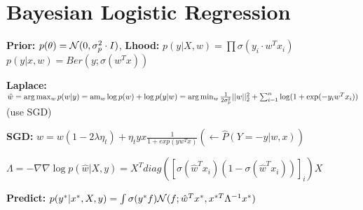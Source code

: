 \section{Bayesian Logistic Regression}
\textbf{Prior:} $p(\theta) = \mathcal{N}(0, \sigma_p^2 \cdot I)$, \textbf{Lhood:} $p(y|X,w) = \prod \sigma(y_i \cdot w^T x_i)$\\
$p(y|x,w) = Ber(y; \sigma(w^T x))$\\
\begin{comment}
	When the argument is positive, then the sigmoid function is evaluating to something bigger than 0.5, if it is negative, it is evaluating to something lower.\\
	Only if the signs of the label and the prediction match the evaluation is positive.\\
\end{comment}

\textbf{Laplace:} $\hat{w} = \arg\max_w p(w | y) 
= \text{am}_w \log p(w) + \log p(y|w)\\
= \arg\min_w \frac{1}{2 \sigma_p^2} ||w||^2_2 + \sum_{i=1}^n \log(1 + \exp(-y_i w^T x_i))$ (use SGD)\\
\begin{comment}
	\textbf{Logistic Regression:} Seeking the mode is giving us the loss of the standart logistic Regression.
	Use log and remove constants to get the Logistic Loss.\\
\end{comment}

\textbf{SGD:} $w = w(1-2\lambda \eta_t)+\eta_t y x \frac{1}{1+exp(yw^Tx)} (\leftarrow \hat{P}(Y = -y | w,x))$

$\Lambda = -\nabla\nabla \log p(\hat{w}| X,y)
= X^T diag([\sigma(\hat{w}^T x_i)(1 - \sigma(\hat{w}^T x_i))]_i) X$

\textbf{Predict:} $p(y^*|x^*,X,y) = \int \sigma(y^*f) \mathcal{N}(f; \hat{w}^Tx^*, x^{*T}\Lambda^{-1} x^*)$\\
\begin{comment}
	This integral still has no closed form, but can be efficiently approximated with Gaussian quadrature.\\
\end{comment}


